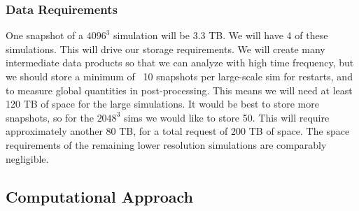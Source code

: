 \documentclass[11pt,letterpaper,english]{article}
\begin{document}
\subsubsection{Data Requirements}

One snapshot of a $4096^3$ simulation will be 3.3 TB. We will have 4 of these simulations. This will drive our storage requirements. We will create many intermediate data products so that we can analyze with high time frequency, but we should store a minimum of ~10 snapshots per large-scale sim for restarts, and to measure global quantities in post-processing. This means we will need at least 120 TB of space for the large simulations. It would be best to store more snapshots, so for the $2048^3$ sims we would like to store 50. This will require approximately another 80 TB, for a total request of 200 TB of space. The space requirements of the remaining lower resolution simulations are comparably negligible.


\vspace{-.25in}
\subsection{Computational Approach}
\vspace{-.2in}



\end{document}
